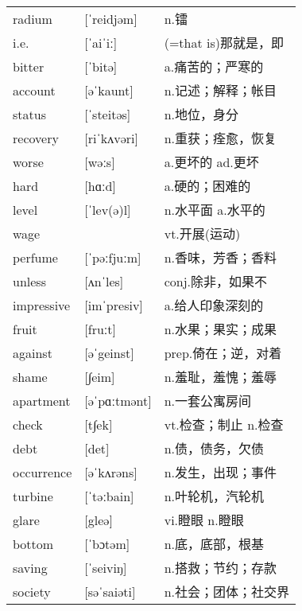 \documentclass[a4paper]{article}
\begin{document}
\section{}
\begin{tabular}{l l l}

radium & [ˈreidjəm] & n.镭 \\
i.e. & [ˈaiˈiː] & (=that is)那就是，即 \\
bitter & [ˈbitə] & a.痛苦的；严寒的 \\
account & [əˈkaunt] & n.记述；解释；帐目 \\
status & [ˈsteitəs] & n.地位，身分 \\
recovery & [riˈkʌvəri] & n.重获；痊愈，恢复 \\
worse & [wəːs] & a.更坏的 ad.更坏 \\
hard & [hɑːd] & a.硬的；困难的 \\
level & [ˈlev(ə)l] & n.水平面 a.水平的 \\
wage &  & vt.开展(运动) \\
perfume & [ˈpəːfjuːm] & n.香味，芳香；香料 \\
unless & [ʌnˈles] & conj.除非，如果不 \\
impressive & [imˈpresiv] & a.给人印象深刻的 \\
fruit & [fruːt] & n.水果；果实；成果 \\
against & [əˈgeinst] & prep.倚在；逆，对着 \\
shame & [∫eim] & n.羞耻，羞愧；羞辱 \\
apartment & [əˈpɑːtmənt] & n.一套公寓房间 \\
check & [t∫ek] & vt.检查；制止 n.检查 \\
debt & [det] & n.债，债务，欠债 \\
occurrence & [əˈkʌrəns] & n.发生，出现；事件 \\
turbine & [ˈtəːbain] & n.叶轮机，汽轮机 \\
glare & [gleə] & vi.瞪眼 n.瞪眼 \\
bottom & [ˈbɔtəm] & n.底，底部，根基 \\
saving & [ˈseiviŋ] & n.搭救；节约；存款 \\
society & [səˈsaiəti] & n.社会；团体；社交界 \\

\end{tabular}
\end{document}

